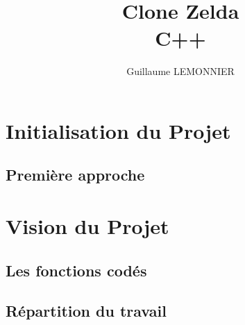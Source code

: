 \documentclass[a4paper,12pt]{article} %
\author{Guillaume LEMONNIER}
\title{Clone Zelda\\C++}
\begin{document}
\maketitle

\newpage

\tableofcontents

\newpage

\section{Initialisation du Projet}

\subsection{Première approche}

\newpage

\section{Vision du Projet}

\subsection{Les fonctions codés}

\subsection{Répartition du travail}
\end{document}
